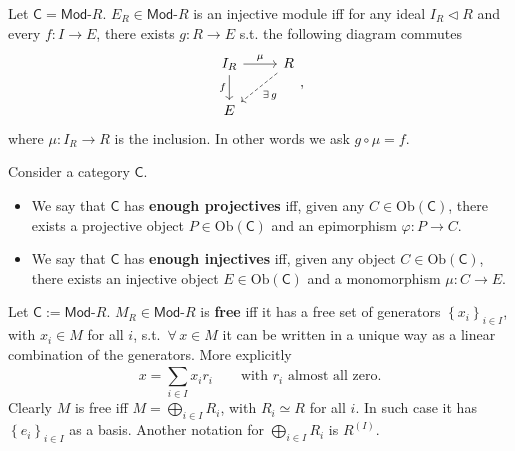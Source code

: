 \begin{prop}
	Let $\mathsf{C} = \mathsf{Mod}\text{-}R$.
	$E_R \in \mathsf{Mod}\text{-}R$ is an injective module iff
	for any ideal $I_R \triangleleft R$ and every $f: I \to E$, there exists $g: R \to E$ s.t.
	the following diagram commutes
	 \begin{equation}
	\begin{tikzcd}
		I_R \arrow[r, "\mu", rightarrow] \arrow[d, "f"', rightarrow] &
		R \arrow[ld, "\exists\, g", dashrightarrow] \\
		E &
	\end{tikzcd}
	,\end{equation} 
	where $\mu: I_R \to R$ is the inclusion.
	In other words we ask $g \circ \mu = f$.
\end{prop} 

\begin{defn}
	Consider a category $\mathsf{C}$.
	\begin{itemize}
		\item We say that $\mathsf{C}$ has \textbf{enough projectives} iff,
	given any $C \in \mathrm{Ob} \left(\mathsf{C}\right)$, 
	there exists a projective object $P \in \mathrm{Ob} \left(\mathsf{C}\right)$ and an epimorphism $\varphi: P \to C$.
	\item We say that $\mathsf{C}$ has \textbf{enough injectives} iff, 
		given any object $C \in \mathrm{Ob} \left(\mathsf{C}\right)$,
		there exists an injective object $E \in \mathrm{Ob} \left(\mathsf{C}\right)$ and a monomorphism
		$\mu: C \to E$.
	\end{itemize}
\end{defn}

\begin{defn}
	Let $\mathsf{C} := \mathsf{Mod}\text{-}R$.
	$M_R \in \mathsf{Mod}\text{-}R$ is \textbf{free} iff it has a free set of generators $\left\{ x_i \right\}_{i \in I}$, 
	with $x_i \in M$ for all $i$, s.t. $\,\forall\, x \in M$ it can be written in a unique way as a linear combination of the generators.
	More explicitly
	\begin{equation}
	x = \sum_{i \in I}^{} x_i r_i \qquad \text{with } r_i \text{ almost all zero}
	.\end{equation} 
	Clearly $M$ is free iff $M = \bigoplus_{i \in I}R_i$, with $R_i \simeq R$ for all $i$.
	In such case it has $\left\{ e_i \right\}_{i \in I}$ as a basis.
	Another notation for $\bigoplus_{i \in I} R_i$ is $R^{(I)}$.
\end{defn}

